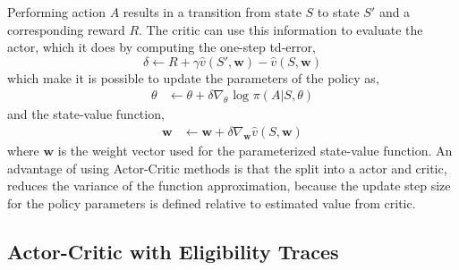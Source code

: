 \documentclass[11pt]{article}
\begin{document}
Performing action $A$ results in a transition from state $S$ to state $S'$ and a corresponding reward $R$. The critic can use this information to evaluate the actor, which it does by computing the one-step td-error,
\begin{equation}
    \delta \leftarrow R + \gamma \hat{v} (S', \mathbf{w}) - \hat{v}(S, \mathbf{w})
\end{equation}
which make it is possible to update the parameters of the policy as,
\begin{equation}
\begin{split}
    \theta &\leftarrow \theta + \delta \nabla_{\theta} \text{ log } \pi(A | S, \theta)
\end{split}
\end{equation}
and the state-value function,
\begin{equation}
\begin{split}
    \mathbf{w} &\leftarrow \mathbf{w} + \delta \nabla_{\mathbf{w}} \hat{v}(S, \mathbf{w})
\end{split}
\end{equation}
where $\mathbf{w}$ is the weight vector used for the parameterized state-value function.
An advantage of using Actor-Critic methods is that the split into a actor and critic, reduces the variance of the function approximation, because the update step size for the policy parameters is defined relative to estimated value from critic.\cite{actCrit}



\subsection{Actor-Critic with Eligibility Traces}
\end{document}
